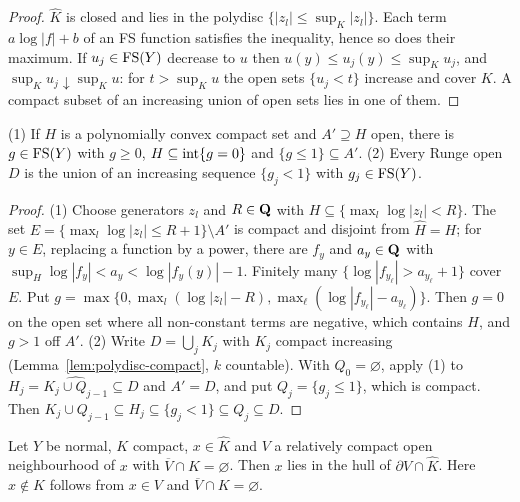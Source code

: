\begin{proof}
$\widehat K$ is closed and lies in the polydisc $\{|z_l|\le\sup_K|z_l|\}$. Each term
$a\log|f|+b$ of an FS function satisfies the inequality, hence so does their maximum. If
$u_j\in\mathrm{FS}(Y)$ decrease to $u$ then $u(y)\le u_j(y)\le\sup_Ku_j$, and $\sup_Ku_j\downarrow\sup_Ku$:
for $t>\sup_Ku$ the open sets $\{u_j<t\}$ increase and cover $K$. A compact subset of an
increasing union of open sets lies in one of them.
\end{proof}

\begin{lemma}\label{lem:polyhedral-neighborhoods}
\leanok
{}
(1) If $H$ is a polynomially convex compact set and $A'\supseteq H$ open, there is $g\in\mathrm{FS}(Y)$ with
$g\ge0$, $H\subseteq\operatorname{int}\{g=0\}$ and $\{g\le1\}\subseteq A'$. (2) Every Runge open $D$ is the
union of an increasing sequence $\{g_j<1\}$ with $g_j\in\mathrm{FS}(Y)$.
\end{lemma}

\begin{proof}
(1) Choose generators $z_l$ and $R\in\mathbf{Q}$ with $H\subseteq\{\max_l\log|z_l|<R\}$. The set
$E=\{\max_l\log|z_l|\le R+1\}\setminus A'$ is compact and disjoint from $\widehat H=H$; for $y\in E$,
replacing a function by a power, there are $f_y$ and $a_y\in\mathbf{Q}$ with
$\sup_H\log|f_y|<a_y<\log|f_y(y)|-1$. Finitely many $\{\log|f_{y_\ell}|>a_{y_\ell}+1\}$ cover $E$.
Put $g=\max\{0,\max_l(\log|z_l|-R),\max_\ell(\log|f_{y_\ell}|-a_{y_\ell})\}$. Then $g=0$ on the open
set where all non-constant terms are negative, which contains $H$, and $g>1$ off $A'$.
(2) Write $D=\bigcup_jK_j$ with $K_j$ compact increasing (Lemma~\ref{lem:polydisc-compact},
$k$ countable). With $Q_0=\varnothing$, apply (1) to $H_j=\widehat{K_j\cup Q_{j-1}}\subseteq D$ and
$A'=D$, and put $Q_j=\{g_j\le1\}$, which is compact. Then
$K_j\cup Q_{j-1}\subseteq H_j\subseteq\{g_j<1\}\subseteq Q_j\subseteq D$.
\end{proof}

\begin{lemma}\label{lem:rossi}
\leanok
{}
Let $Y$ be normal, $K$ compact, $x\in\widehat K$ and $V$ a relatively compact open
neighbourhood of $x$ with $\overline V\cap K=\varnothing$. Then $x$ lies in the hull of
$\partial V\cap\widehat K$. Here $x\notin K$ follows from $x\in V$ and $\overline V\cap K=\varnothing$.
\end{lemma}

